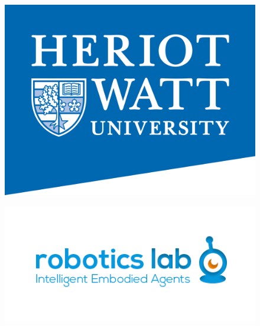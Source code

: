 \documentclass[11pt,a4paper]{article}
\begin{document}
\thispagestyle{empty}
\begin{figure}
\centering
\begin{minipage}{.5\textwidth}
  \centering
  \includegraphics[width=.7\linewidth]{hwlogo}
  \label{fig:test1}
\end{minipage}%
\begin{minipage}{.5\textwidth}
  \centering
  \includegraphics[width=\linewidth]{roboticslogo}
  \label{fig:test2}
\end{minipage}
\end{figure}
\end{document}
